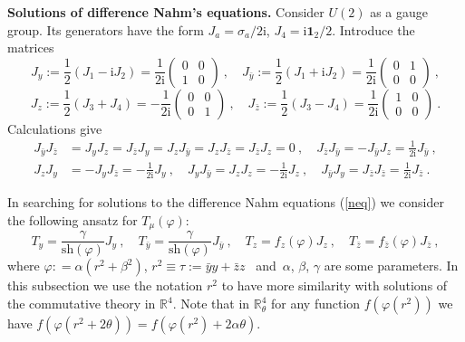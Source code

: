 \documentclass[a4paper,11pt]{article}
\numberwithin{equation}{section}
\def\th{\theta}
\def\a{\alpha}
\def\b{\beta}
\def\g{\gamma}
\def\vp{\varphi}
\def\m{\mu}
\newcommand{\im}{\mathrm{i}}
\newcommand{\sh}{\mathrm{sh}}
\newcommand{\zb}{{\bar{z}}}
\newcommand{\rc}{{\mathbb{R}^4}}
\newcommand{\rct}{{\mathbb{R}^4_\theta}}
\newcommand{\Id}{\mathbf{1}_2}
\begin{document}
{\bf Solutions of difference Nahm's equations.} 
Consider $U(2)$ as a gauge group. Its generators have the form
$J_a=\sigma_a/2\im$, $J_4=\im {\Id}/{2}$.
Introduce the matrices
\begin{equation}
J_y:=\frac{1}{2}(J_1-\im J_2)=
\frac{1}{2\im}\begin{pmatrix}0&0\\1&0\end{pmatrix}\ ,
\quad
J_{\bar y}:=\frac{1}{2}(J_1+\im J_2)=
\frac{1}{2\im}\begin{pmatrix}0&1\\0&0\end{pmatrix}\ ,
\nonumber
\end{equation}
\begin{equation}
J_z:=\frac{1}{2}(J_3+ J_4)=-\frac{1}{2\im}\begin{pmatrix}0&0\\0&1
\end{pmatrix}\ ,\quad
J_{\bar z}:=\frac{1}{2}(J_3- J_4)=\frac{1}{2\im}\begin{pmatrix}1&0\\0&0
\end{pmatrix}\ .
\label{gen}
\end{equation}
Calculations give
\begin{align}
J_{\bar y}J_{\bar z}&=J_yJ_z=J_{\bar z}J_{y}=J_zJ_{\bar y}=J_zJ_{\bar z}=J_{\bar z}J_z=0\ , 
\quad J_{\bar z}J_{\bar y}= - J_{\bar y}J_z=\frac{1}{2\im} J_{\bar y}\ , 
\nonumber\\[8pt]
J_zJ_y &= - J_yJ_{\bar z}=   -\frac{1}{2\im} J_y\ ,\quad
J_yJ_{\bar y}=J_zJ_z= -\frac{1}{2\im}J_z\ ,
\quad  J_{\bar y}J_y= J_\zb J_\zb=\frac{1}{2\im}J_{\bar z}\ .
\label{prop}
\end{align}


In searching for solutions to the difference Nahm equations (\ref{neq})
we consider the following ansatz for $T_\m (\vp)$: 
\begin{equation}
T_y= \frac{\g}{\sh(\vp )}J_y\ , \quad
T_{\bar y}= \frac{\g}{\sh(\vp )} J_{\bar y} \ ,\quad
T_z= f_z(\vp )J_z\ , \quad
T_{\bar z}=f_{\bar z}(\vp )J_{\bar z}\ ,
\label{ans3}
\end{equation}
where $\vp: = \a (r^2 + \b^2)$, $r^2\equiv \tau :=\bar yy +\bar zz$  \ and\ 
$\a$, $\b$, $\g$ are some parameters. In this subsection we use the notation
$r^2$ to have more similarity with solutions of the commutative theory in $\rc$. 
Note that in $\rct$ for any function $f(\vp (r^2))$ we have 
$f(\vp (r^2 + 2\th))=f(\vp (r^2) + 2\a\th)$.
\end{document}
